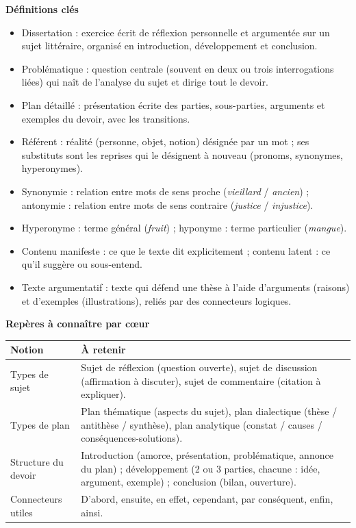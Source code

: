 \documentclass[11pt]{article}
\newcommand{\cle}[1]{{\popxbold\color{popdark}#1}}
\begin{document}
\begin{bilan}
\textbf{Définitions clés}
\begin{itemize}
  \item \cle{Dissertation} : exercice écrit de réflexion personnelle et argumentée sur un sujet littéraire, organisé en introduction, développement et conclusion.
  \item \cle{Problématique} : question centrale (souvent en deux ou trois interrogations liées) qui naît de l'analyse du sujet et dirige tout le devoir.
  \item \cle{Plan détaillé} : présentation écrite des parties, sous-parties, arguments et exemples du devoir, avec les transitions.
  \item \cle{Référent} : réalité (personne, objet, notion) désignée par un mot ; ses \cle{substituts} sont les reprises qui le désignent à nouveau (pronoms, synonymes, hyperonymes).
  \item \cle{Synonymie} : relation entre mots de sens proche (\emph{vieillard} / \emph{ancien}) ; \cle{antonymie} : relation entre mots de sens contraire (\emph{justice} / \emph{injustice}).
  \item \cle{Hyperonyme} : terme général (\emph{fruit}) ; \cle{hyponyme} : terme particulier (\emph{mangue}).
  \item \cle{Contenu manifeste} : ce que le texte dit explicitement ; \cle{contenu latent} : ce qu'il suggère ou sous-entend.
  \item \cle{Texte argumentatif} : texte qui défend une thèse à l'aide d'arguments (raisons) et d'exemples (illustrations), reliés par des connecteurs logiques.
\end{itemize}

\textbf{Repères à connaître par cœur}
\begin{center}
\begin{tabularx}{\linewidth}{|l|X|}
\hline
\rowcolor{popblueL} \textbf{Notion} & \textbf{À retenir} \\
\hline
Types de sujet & Sujet de réflexion (question ouverte), sujet de discussion (affirmation à discuter), sujet de commentaire (citation à expliquer). \\
\hline
Types de plan & Plan thématique (aspects du sujet), plan dialectique (thèse / antithèse / synthèse), plan analytique (constat / causes / conséquences-solutions). \\
\hline
Structure du devoir & Introduction (amorce, présentation, problématique, annonce du plan) ; développement (2 ou 3 parties, chacune : idée, argument, exemple) ; conclusion (bilan, ouverture). \\
\hline
Connecteurs utiles & D'abord, ensuite, en effet, cependant, par conséquent, enfin, ainsi. \\
\hline
\end{tabularx}
\end{center}


\end{bilan}
\end{document}
